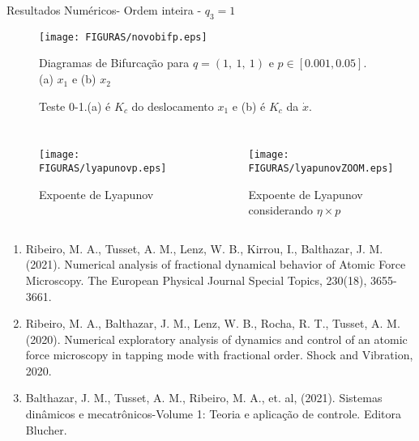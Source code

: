 \documentclass[12pt,aspectratio=169]{beamer}
\begin{document}
\begin{frame}{Resultados Numéricos- Ordem inteira - $q_3=1$}
\begin{figure}[h]
\centering
\texttt{[image: FIGURAS/novobifp.eps]}
\caption{Diagramas de Bifurcação para $q=(1,~1,~1)$ e $p\in[0.001,0.05]$. (a) $x_1$ e (b)  $x_2$}
\end{figure}
\end{frame}

\begin{frame}{}
    \begin{figure}[!ht]
\centering
{}
\caption{Teste 0-1.(a) é $K_c$ do deslocamento $x_1$ e (b) é $K_c$ da $\dot{x}$. }
\label{fig:5}       %
\end{figure}
\end{frame}

\begin{frame}
\begin{columns}
\begin{figure}[h]
\centering
\texttt{[image: FIGURAS/lyapunovp.eps]}
\caption{Expoente de Lyapunov}
\end{figure}
\begin{figure}[h]
\centering
\texttt{[image: FIGURAS/lyapunovZOOM.eps]}
\caption{Expoente de Lyapunov considerando $\eta \times p $}
\end{figure}
\end{columns}
\end{frame}

\begin{frame}{}
\begin{enumerate}
    \item Ribeiro, M. A., Tusset, A. M., Lenz, W. B., Kirrou, I., Balthazar, J. M. (2021). Numerical analysis of fractional dynamical behavior of Atomic Force Microscopy. The European Physical Journal Special Topics, 230(18), 3655-3661.
    \item Ribeiro, M. A., Balthazar, J. M., Lenz, W. B., Rocha, R. T., Tusset, A. M. (2020). Numerical exploratory analysis of dynamics and control of an atomic force microscopy in tapping mode with fractional order. Shock and Vibration, 2020.
    \item Balthazar, J. M., Tusset, A. M., Ribeiro, M. A., et. al, (2021). Sistemas dinâmicos e mecatrônicos-Volume 1: Teoria e aplicação de controle. Editora Blucher.
\end{enumerate}
    
\end{frame}
\end{document}
